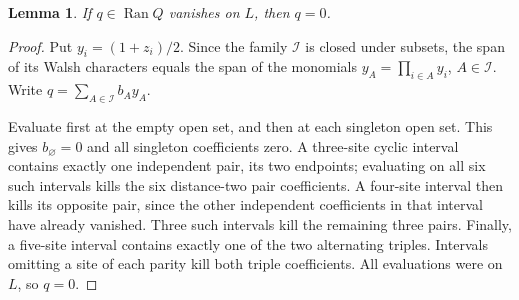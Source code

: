 \documentclass[11pt]{amsart}
\newtheorem{lemma}[theorem]{Lemma}
\theoremstyle{remark}
\newcommand{\cI}{\mathcal I}
\begin{document}
\begin{lemma}\label{lem:rank}
If $q\in\operatorname{Ran}Q$ vanishes on $L$, then $q=0$.
\end{lemma}
\begin{proof}
Put $y_i=(1+z_i)/2$. Since the family $\cI$ is closed under subsets, the span of its Walsh characters equals the span of the monomials $y_A=\prod_{i\in A}y_i$, $A\in\cI$. Write $q=\sum_{A\in\cI}b_Ay_A$.

Evaluate first at the empty open set, and then at each singleton open set. This gives $b_\varnothing=0$ and all singleton coefficients zero. A three-site cyclic interval contains exactly one independent pair, its two endpoints; evaluating on all six such intervals kills the six distance-two pair coefficients. A four-site interval then kills its opposite pair, since the other independent coefficients in that interval have already vanished. Three such intervals kill the remaining three pairs. Finally, a five-site interval contains exactly one of the two alternating triples. Intervals omitting a site of each parity kill both triple coefficients. All evaluations were on $L$, so $q=0$.
\end{proof}
\end{document}
